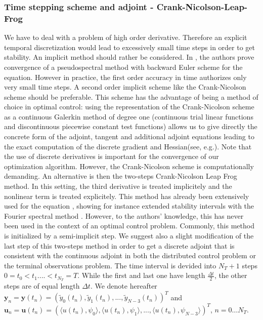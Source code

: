 \subsubsection{Time stepping scheme and adjoint - Crank-Nicolson-Leap-Frog}
We have to deal with a problem of high order derivative. Therefore an explicit temporal discretization would lead to excessively small time steps in order to get stability. An implicit method should rather be considered. In \cite{li2000error}, the authors prove convergence of a pseudospectral method with backward Euler scheme for the \KdV equation. However in practice, the first order accuracy in time authorizes only very small time steps. A second order implicit scheme like the Crank-Nicolson scheme should be preferable. This scheme has the advantage of being a method of choice in optimal control: using the representation of the Crank-Nicolson scheme as a continuous Galerkin method of degree one (continuous trial linear functions and discontinuous piecewise constant test functions) allows us to give directly the concrete form of the adjoint, tangent and additional adjoint equations leading to the exact computation of the discrete gradient and Hessian(see, e.g.\cite{meidner2007adaptive}). Note that the use of discrete derivatives is important for the convergence of our optimization algorithm. However, the Crank-Nicolson scheme is computationally demanding. An alternative is then the two-steps Crank-Nicolson Leap Frog method. In this setting, the third derivative is treated implicitely and the nonlinear term is treated explicitely. This method has already been extensively used for the \KdV equation \cite{shen2003new,ma2000legendre,ma2001optimal}, showing for instance extended stability intervals with the Fourier spectral method \cite{chan1985fourier}. However, to the authors' knowledge, this has never been used in the context of an optimal control problem. Commonly, this method is initialized by a semi-implicit step. We suggest also a slight modification of the last step of this two-steps method in order to get a discrete adjoint that is consistent with the continuous adjoint in both the distributed control problem or the terminal observations problem. The time interval is devided into $N_{T}+1$ steps $0 = t_0 < t_1....< t_{N_{T}} = T$. While the first and last one have length $\frac{\Delta t}{2}$, the other steps are of equal length $\Delta t$. We denote hereafter
$\mathbf{y}_n = \mathbf{y}(t_n) = \left( \tilde y_0(t_n), \tilde y_1(t_n), ..., \tilde y_{N-3}(t_n)\right)^T$
and
$\mathbf{u}_n = \mathbf{u}(t_n) = \left( \langle u(t_n), \psi_0 \rangle, \langle u(t_n), \psi_1 \rangle, ..., \langle u(t_n), \psi_{N-3} \rangle\right)^T$, $ n=0 \ldots N_{T}$.
